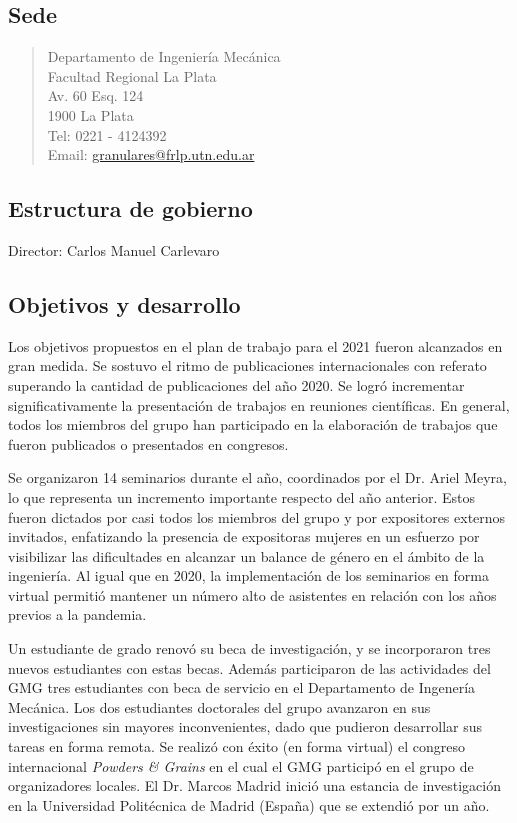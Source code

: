 \documentclass[a4paper,11pt,twoside,final,titlepage,onecolumn,openright]{report}
\begin{document}
 \subsection{Sede}
\begin{quote}
Departamento de Ingeniería Mecánica \\
Facultad Regional La Plata\\
Av. 60 Esq. 124\\
1900 La Plata \\
Tel: 0221 - 4124392\\
Email: \href{mailto://granulares@frlp.utn.edu.ar}{granulares@frlp.utn.edu.ar}
\end{quote}


\subsection{Estructura de gobierno}
Director: Carlos Manuel Carlevaro

\subsection{Objetivos y desarrollo}
Los objetivos propuestos en el plan de trabajo para el 2021 fueron alcanzados en gran medida. Se sostuvo el ritmo de publicaciones internacionales con referato superando la cantidad de publicaciones del año 2020. Se logró incrementar significativamente la presentación de trabajos en reuniones científicas. En general, todos los miembros del grupo han participado en la elaboración de trabajos que fueron publicados o presentados en congresos.

Se organizaron 14 seminarios durante el año, coordinados por el Dr. Ariel Meyra, lo que representa un incremento importante respecto del año anterior. Estos fueron dictados por casi todos los miembros del grupo y por expositores externos invitados, enfatizando la presencia de expositoras mujeres en un esfuerzo por visibilizar las dificultades en alcanzar un balance de género en el ámbito de la ingeniería. Al igual que en 2020, la implementación de los seminarios en forma virtual permitió mantener un número alto de asistentes en relación con los años previos a la pandemia.

Un estudiante de grado renovó su beca de investigación, y se incorporaron tres nuevos estudiantes con estas becas. Además participaron de las actividades del GMG tres estudiantes con beca de servicio en el Departamento de Ingenería Mecánica. Los dos estudiantes doctorales del grupo avanzaron en sus investigaciones sin mayores inconvenientes, dado que pudieron desarrollar sus tareas en forma remota. Se realizó con éxito (en forma virtual) el congreso internacional \textit{Powders \& Grains} en el cual el GMG participó en el grupo de organizadores locales. El Dr. Marcos Madrid inició una estancia de investigación en la Universidad Politécnica de Madrid (España) que se extendió por un año. 
\end{document}
